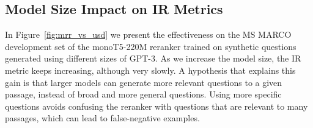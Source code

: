 \documentclass[11pt]{article}
\begin{document}

\subsection{Model Size Impact on IR Metrics}
\label{sec:model_size}


In Figure~\ref{fig:mrr_vs_usd} we present the effectiveness on the MS MARCO development set of the monoT5-220M reranker trained on synthetic questions generated using different sizes of GPT-3. As we increase the model size, the IR metric keeps increasing, although very slowly. A hypothesis that explains this gain is that larger models can generate more relevant questions to a given passage, instead of broad and more general questions. Using more specific questions avoids confusing the reranker with questions that are relevant to many passages, which can lead to false-negative examples.
\end{document}
